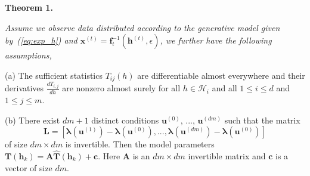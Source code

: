 \documentclass[twoside]{article}
\begin{document}
\textbf{Theorem 1.} {\it Assume we observe data distributed according to the generative model given by~(\ref{eq:exp_h}) and $\mathbf{x}^{(t)} = \mathbf{f}^{-1}_t(\mathbf{h}^{(t)}, \epsilon)$, we further have the following assumptions,

\vspace{0.05in}

(a) The sufficient statistics $T_{ij}(h)$ are differentiable almost everywhere and their derivatives $\frac{d T_{i,j}}{d h}$ are nonzero almost surely for all $h\in \mathcal{H}_i$ and all $1\leq i \leq d$ and $1 \leq j  \leq m$.

\vspace{0.05in}


(b) There exist $dm+1$ distinct conditions $\mathbf{u}^{(0)}$, ..., $\mathbf{u}^{(dm)}$  such that the matrix 
\begin{equation*} 
\mathbf{L} = [\mathbf{\lambda}(\mathbf{u}^{(1)}) - \mathbf{\lambda}(\mathbf{u}^{(0)}), ..., \mathbf{\lambda}(\mathbf{u}^{(dm)}) - \mathbf{\lambda}(\mathbf{u}^{(0)}) ]
\end{equation*} 
of size $dm \times dm$ is invertible.
Then the model parameters 
$\mathbf{T}(\mathbf{h}_k) = \mathbf{A}\widehat{\mathbf{T}}(\mathbf{h}_k) + \mathbf{c}.$ Here $\mathbf{A}$ is an $dm \times dm$ invertible matrix and $\mathbf{c}$ is a vector of size $dm$.
}
\end{document}
